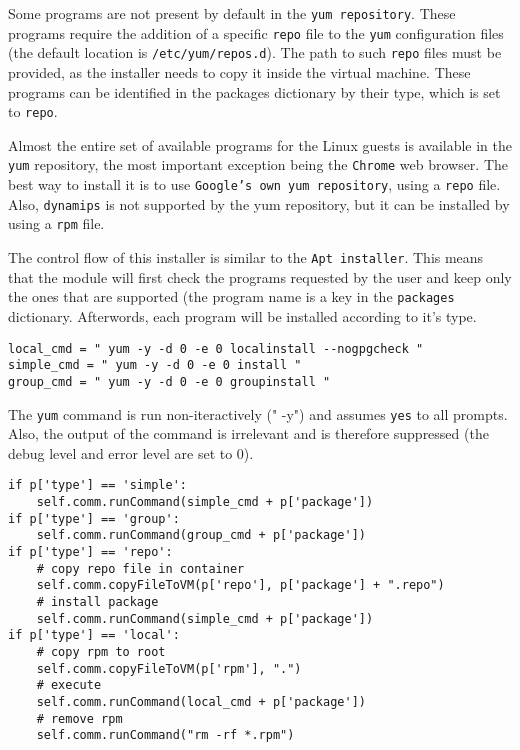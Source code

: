 Some programs are not present by default in the \texttt{yum repository}. 
These programs require the addition of a specific \texttt{repo} file to the 
\texttt{yum} configuration files (the default location is \texttt{/etc/yum/repos.d}). 
The path to such \texttt{repo} files must be provided, as the installer needs to 
copy it inside the virtual machine. These programs can be identified in the 
packages dictionary by their type, which is set to \texttt{repo}.

Almost the entire set of available programs for the Linux guests is available in the 
\texttt{yum} repository, the most important exception being the \texttt{Chrome} 
web browser. The best way to install it is to use \texttt{Google's own yum 
repository}, using a \texttt{repo} file. Also, \texttt{dynamips} is not supported 
by the yum repository, but it can be installed by using a \texttt{rpm} file.

The control flow of this installer is similar to the \texttt{Apt installer}. This means 
that the module will first check the programs requested by the user and keep only 
the ones that are supported (the program name is a key in the \texttt{packages} 
dictionary. Afterwords, each program will be installed according to it's type.
\\
\lstset{language=Python,caption=Install commands,
label=lst:inst-yum-cmd}
\begin{lstlisting}
local_cmd = " yum -y -d 0 -e 0 localinstall --nogpgcheck "
simple_cmd = " yum -y -d 0 -e 0 install "
group_cmd = " yum -y -d 0 -e 0 groupinstall "
\end{lstlisting}

The \texttt{yum} command is run non-iteractively (" -y") and assumes \texttt{yes} 
to all prompts. Also, the output of the command is irrelevant and is therefore 
suppressed (the debug level and error level are set to 0).
\\
\lstset{language=Python,caption=Install commands,
label=lst:inst-cmd}
\begin{lstlisting}
if p['type'] == 'simple':
	self.comm.runCommand(simple_cmd + p['package'])
if p['type'] == 'group':
	self.comm.runCommand(group_cmd + p['package'])
if p['type'] == 'repo':
	# copy repo file in container
	self.comm.copyFileToVM(p['repo'], p['package'] + ".repo")
	# install package
	self.comm.runCommand(simple_cmd + p['package'])
if p['type'] == 'local':
	# copy rpm to root
	self.comm.copyFileToVM(p['rpm'], ".")
	# execute
	self.comm.runCommand(local_cmd + p['package'])
	# remove rpm
	self.comm.runCommand("rm -rf *.rpm")
\end{lstlisting}

